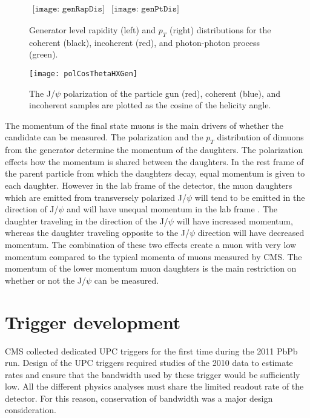     \begin{figure}[!Hhbt]
      \centering
      $ \begin{array}{cc}
        \texttt{[image: genRapDis]} &
        \texttt{[image: genPtDis]}
      \end{array} $
      \caption{Generator level rapidity (left) and $p_{T}$ (right) 
          distributions for the coherent (black), incoherent (red), 
          and photon-photon process (green).}
      \label{fig:starlightRapPtDist}
    \end{figure}

    \begin{figure}[!Hhbt]
      \centering
      \texttt{[image: polCosThetaHXGen]}
      \caption{ The J/$\psi$ polarization of the particle gun (red),
        coherent (blue), and incoherent samples are plotted as the
        cosine of the helicity angle.} 
      \label{fig:genHXAngle}
    \end{figure}
    The momentum of the final state muons is the main drivers of whether the 
      candidate can be measured. 
    The polarization and the $p_{T}$ distribution of dimuons from the generator
      determine the momentum of the daughters. 
    The polarization effects how the momentum is shared between the daughters.
    In the rest frame of the parent particle from which the daughters decay,
      equal momentum is given to each daughter. 
    However in the lab frame of the detector, the muon daughters which are 
      emitted from transversely polarized J/$\psi$ will tend to be emitted in
      the direction of J/$\psi$ and will have unequal momentum in the lab 
      frame \DIFaddbegin {}\DIFaddend .
    The daughter traveling in the direction of the J/$\psi$ will have increased
      momentum, whereas the daughter traveling opposite to the J/$\psi$ 
      direction will have decreased momentum. 
    The combination of these two effects create a muon with very low momentum 
      compared to the typical momenta of muons measured by CMS. 
    The momentum of the lower momentum muon daughters is the main restriction
      on whether or not the J/$\psi$ can be measured. 

  \section{\label{sec:TrigDev} Trigger development} 
    CMS collected dedicated UPC triggers for the first time during the 2011 
      PbPb run.
    Design of the UPC triggers required studies of the 2010 data to estimate 
      rates and ensure that the bandwidth used by these trigger would be
      sufficiently low. 
    All the different physics analyses must share the limited readout rate of 
      the detector.
    For this reason, conservation of bandwidth was a major design consideration.

